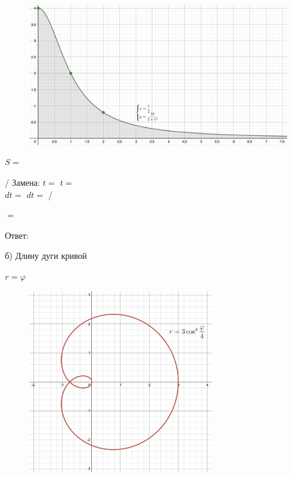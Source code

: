 \documentclass[12pt]{article}
\begin{document}
\begin{figure}[ht!]
\centering
\includegraphics[width=325pt]{Figures/12a.png}
\end{figure}

$S=$\vspace{2.5mm}

/ Замена: $t= $  \hspace{2.5mm}  $t=$ \vspace{2.5mm}\\
$dt=$ \hspace{2.5mm} $dt=$ /\vspace{2.5mm}

$=$\vspace{2.5mm}

Ответ: $ $\vspace{2.5mm}

б) Длину дуги кривой\vspace{2.5mm}

$r=\varphi$\vspace{2.5mm}

\begin{figure}[ht!]
\centering
\includegraphics[width=225pt]{Figures/12b.png}
\end{figure}
\end{document}

